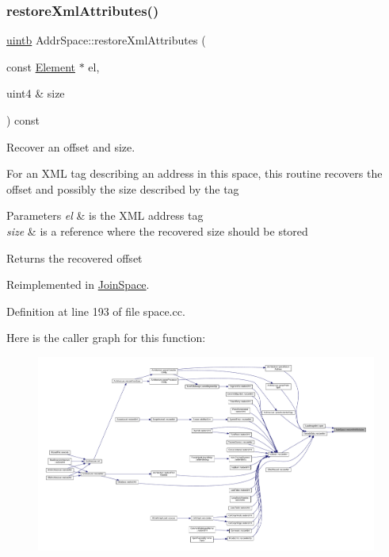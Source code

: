 \subsubsection{\texorpdfstring{restoreXmlAttributes()}{restoreXmlAttributes()}}
{\footnotesize\ttfamily \mbox{\hyperlink{types_8h_a2db313c5d32a12b01d26ac9b3bca178f}{uintb}} Addr\+Space\+::restore\+Xml\+Attributes (\begin{DoxyParamCaption}\item[{const \mbox{\hyperlink{class_element}{Element}} $\ast$}]{el,  }\item[{uint4 \&}]{size }\end{DoxyParamCaption}) const\hspace{0.3cm}{\ttfamily [virtual]}}



Recover an offset and size. 

For an X\+ML tag describing an address in this space, this routine recovers the offset and possibly the size described by the tag 
\begin{DoxyParams}{Parameters}
{\em el} & is the X\+ML address tag \\
\hline
{\em size} & is a reference where the recovered size should be stored \\
\hline
\end{DoxyParams}
\begin{DoxyReturn}{Returns}
the recovered offset 
\end{DoxyReturn}


Reimplemented in \mbox{\hyperlink{class_join_space_aca1360dbe0abf4a9ace679887cb47c17}{Join\+Space}}.



Definition at line 193 of file space.\+cc.

Here is the caller graph for this function\+:
\nopagebreak
\begin{figure}[H]
\begin{center}
\leavevmode
\includegraphics[width=350pt]{class_addr_space_aa20e53222697512db0a64db75179ead2_icgraph}
\end{center}
\end{figure}
\mbox{\label{class_addr_space_a7acbe22e2d26a7e70ef09fdfa646e9af}} 
